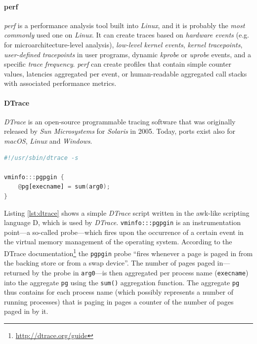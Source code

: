 \paragraph{perf}

    \textit{perf} is a performance analysis tool built into \textit{Linux}, and it is probably the \emph{most commonly} used one on \textit{Linux}. It can create traces based on \emph{hardware events} (e.g. for microarchitecture-level analysis), \emph{low-level kernel events}, \emph{kernel tracepoints}, \emph{user-defined tracepoints} in user programs, dynamic \textit{kprobe} or \textit{uprobe} events, and a specific \emph{trace frequency}. \textit{perf} can create profiles that contain simple counter values, latencies aggregated per event, or human-readable aggregated call stacks with associated performance metrics.

\paragraph{DTrace}

    \textit{DTrace} is an open-source programmable tracing software that was originally released by \textit{Sun Microsystems} for \textit{Solaris} in 2005. Today, ports exist also for \textit{macOS}, \textit{Linux} and \textit{Windows}.

\begin{@empty}
    \begin{code}[h!]
        \begin{lstlisting}[language = awk]
#!/usr/sbin/dtrace -s

vminfo:::pgpgin {
    @pg[execname] = sum(arg0);
}
        \end{lstlisting}
        \caption[DTrace script example]{\textit{DTrace} script pgpginbyproc.d from the \emph{DTrace Toolkit}\footnote{\url{https://github.com/opendtrace/toolkit}}}
        \label{lst:dtrace}
    \end{code}
\end{@empty}

    Listing \ref{lst:dtrace} shows a simple \textit{DTrace} script written in the awk-like scripting language D, which is used by \textit{DTrace}. \lstinline|vminfo:::pgpgin| is an instrumentation point---a so-called probe---which fires upon the occurrence of a certain event in the virtual memory management of the operating system. According to the DTrace documentation\footnote{\url{http://dtrace.org/guide}} the \lstinline|pgpgin| probe ``fires whenever a page is paged in from the backing store or from a swap device''. The number of pages paged in---returned by the probe in \lstinline|arg0|---is then aggregated per process name (\lstinline|execname|) into the aggregate \lstinline|pg| using the \lstinline|sum()| aggregation function. The aggregate \lstinline|pg| thus contains for each process name (which possibly represents a number of running processes) that is paging in pages a counter of the number of pages paged in by it.

